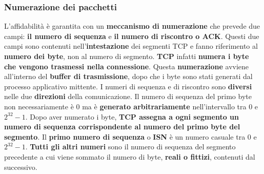 \documentclass[11pt,a4paper,oneside]{book}
\theoremstyle{definition}
\begin{document}
\subsubsection{Numerazione dei pacchetti}
L'affidabilità è garantita con un \textbf{meccanismo di numerazione} che prevede due campi: \textbf{il numero di sequenza} e \textbf{il numero di riscontro o ACK}. Questi due campi sono contenuti nell'\textbf{intestazione} dei segmenti TCP e fanno riferimento al \textbf{numero dei byte}, non al numero di segmento. \textbf{TCP} infatti \textbf{numera i byte che vengono trasmessi nella connessione}. Questa \textbf{numerazione} avviene all'interno del \textbf{buffer di trasmissione}, dopo che i byte sono stati generati dal processo applicativo mittente. I numeri di sequenza e di riscontro sono \textbf{diversi} nelle due \textbf{direzioni} della comunicazione. Il numero di sequenza del primo byte non necessariamente è 0 ma è \textbf{generato arbitrariamente} nell'intervallo tra 0 e $2^{32} - 1$.
Dopo aver numerato i byte, \textbf{TCP assegna a ogni segmento un numero di sequenza corrispondente al numero del primo byte del segmento}.
Il \textbf{primo numero di sequenza} o \textbf{ISN} è un numero casuale tra 0 e $2^{32} -1$. \textbf{Tutti gli altri numeri }sono il numero di sequenza del segmento precedente a cui viene sommato il numero di byte, \textbf{reali o fittizi}, contenuti dal successivo.

\pagebreak
\end{document}
